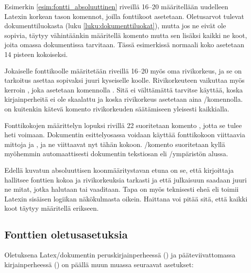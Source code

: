 \begin{koodilohkosis}
  \sffamilyabs\fontsize{16bp}{18bp}\bfseries
\end{koodilohkosis}

Esimerkin \ref{esim:fontti_absoluuttinen} riveillä 16--20 määritellään
uudelleen Latexin korkean tason komennot, joilla fonttikoot asetetaan.
Oletus\-arvot tulevat dokumenttiluokasta (luku
\ref{luku:dokumenttiluokat}), mutta jos ne eivät ole sopivia, täytyy
vähintäänkin määritellä komento  mutta sen
lisäksi kaikki ne koot, joita omassa dokumentissa tarvitaan. Tässä
esimerkissä normaali koko asetetaan 14 pisteen kokoiseksi.

Jokaiselle fonttikoolle määritetään riveillä 16--20 myös oma
rivikorkeus, ja se on tarkoitus asettaa sopivaksi juuri kyseiselle
koolle. Rivikorkeuteen vaikuttaa myös kerroin , joka asetetaan komennolla .
Sitä ei välttämättä tarvitse käyttää, koska kirjainperheitä ei ole
skaalattu ja koska rivikorkeus asetetaan aina \-/komennolla.  on kuitenkin kätevä
komento rivikorkeuden säätämiseen yleisesti kaikkialla.

Fonttikokojen määrittelyn lopuksi rivillä 22 suoritetaan komento
, jotta se tulee heti voimaan. Dokumentin
esittelyosassa voidaan käyttää fonttikokoon viittaavia mittoja
 ja , ja ne viittaavat nyt tähän kokoon.
\-/komento suoritetaan kyllä myöhemmin
automaattisesti dokumentin tekstiosan eli \-/ympäristön
alussa.

Edellä kuvatun absoluuttisen koonmääritystavan etuna on se, että
kirjoittaja hallitsee fonttien kokoa ja rivikorkeuksia tarkasti ja että
julkaisuun saadaan juuri ne mitat, jotka halutaan tai vaaditaan. Tapa on
myös teknisesti eheä eli toimii Latexin sisäisen logiikan näkökulmasta
oikein. Haittana voi pitää sitä, että kaikki koot täytyy määritellä
erikseen.

\subsection{Fonttien oletus\-asetuksia}

Oletuksena%
 
Latex\-/dokumentin peruskirjainperheessä ()
ja pääteviivattomassa kirjainperheessä ()
on päällä muun muassa seuraavat asetukset:%

